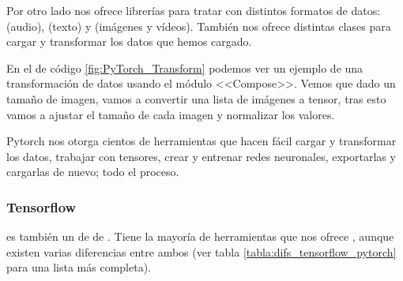 Por otro lado nos ofrece librerías para tratar con distintos formatos de datos:  (audio),  (texto) y  (imágenes y vídeos). También nos ofrece distintas clases para cargar   y transformar los datos que hemos cargado.

En el  de código \ref{fig:PyTorch_Transform} podemos ver un ejemplo de una transformación de datos usando el módulo <<Compose>>. Vemos que dado un tamaño de imagen, vamos a convertir una lista de imágenes a tensor, tras esto vamos a ajustar el tamaño de cada imagen y normalizar los valores.


Pytorch nos otorga cientos de herramientas que hacen fácil cargar y transformar los datos, trabajar con tensores, crear y entrenar redes neuronales, exportarlas y cargarlas de nuevo; todo el proceso.

\subsubsection{Tensorflow}

 es también un  de  de . Tiene la mayoría de herramientas que nos ofrece , aunque existen varias diferencias entre ambos (ver tabla \ref{tabla:difs_tensorflow_pytorch} para una lista más completa).


